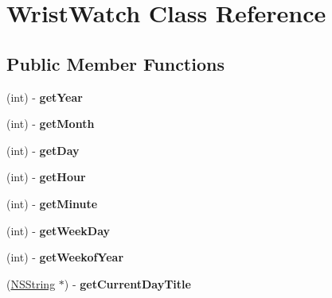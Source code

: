 \hypertarget{interface_wrist_watch}{
\section{WristWatch Class Reference}
\label{interface_wrist_watch}
}
\subsection*{Public Member Functions}
\begin{DoxyCompactItemize}
\item 
\hypertarget{interface_wrist_watch_ac5a4ef3f0f7ac9e0c89a211bb20d7e88}{
(int) -\/ {\bfseries getYear}}
\label{interface_wrist_watch_ac5a4ef3f0f7ac9e0c89a211bb20d7e88}

\item 
\hypertarget{interface_wrist_watch_adef60a377ba208f01bf8c9bbd993578c}{
(int) -\/ {\bfseries getMonth}}
\label{interface_wrist_watch_adef60a377ba208f01bf8c9bbd993578c}

\item 
\hypertarget{interface_wrist_watch_afbd0700c69feefbeddaa61f8a843df7e}{
(int) -\/ {\bfseries getDay}}
\label{interface_wrist_watch_afbd0700c69feefbeddaa61f8a843df7e}

\item 
\hypertarget{interface_wrist_watch_a1e2ff34d80404697aa1801a87dc35fc1}{
(int) -\/ {\bfseries getHour}}
\label{interface_wrist_watch_a1e2ff34d80404697aa1801a87dc35fc1}

\item 
\hypertarget{interface_wrist_watch_a5904b201018a96a5a634142e9c4db2f6}{
(int) -\/ {\bfseries getMinute}}
\label{interface_wrist_watch_a5904b201018a96a5a634142e9c4db2f6}

\item 
\hypertarget{interface_wrist_watch_a261a6ecdd6e388de223e248d4dc67ec2}{
(int) -\/ {\bfseries getWeekDay}}
\label{interface_wrist_watch_a261a6ecdd6e388de223e248d4dc67ec2}

\item 
\hypertarget{interface_wrist_watch_af2a428100934c2111b1ca2e3e58d1cd9}{
(int) -\/ {\bfseries getWeekofYear}}
\label{interface_wrist_watch_af2a428100934c2111b1ca2e3e58d1cd9}

\item 
\hypertarget{interface_wrist_watch_a0343174406133bf517178be4968e45a0}{
(\hyperlink{class_n_s_string}{NSString} $\ast$) -\/ {\bfseries getCurrentDayTitle}}
\label{interface_wrist_watch_a0343174406133bf517178be4968e45a0}


\end{DoxyCompactItemize}
